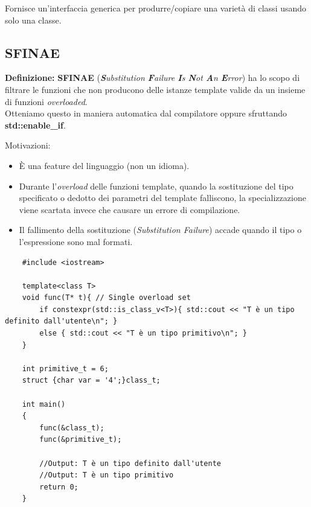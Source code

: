 \textsf{\small Fornisce un'interfaccia generica per produrre/copiare una varietà di classi usando solo una classe.} \\

\subsection{SFINAE}

\label{SFINAE}

\textsf{\small \textbf{Definizione: } \textbf{SFINAE} (\emph{\textbf{S}ubstitution \textbf{F}ailure \textbf{I}s \textbf{N}ot \textbf{A}n \textbf{E}rror}) ha lo scopo di filtrare le funzioni che non producono delle istanze template valide da un insieme di funzioni \emph{overloaded}.} \\

\textsf{\small Otteniamo questo in maniera automatica dal compilatore oppure sfruttando \textbf{std::enable\_if}.} \break

\textsf{\small Motivazioni: } \\

\begin{itemize}
	\item \textsf{\small È una feature del linguaggio (non un idioma).}
	\item \textsf{\small Durante l'\emph{overload} delle funzioni template, quando la sostituzione del tipo specificato o dedotto dei parametri del template falliscono, la specializzazione viene scartata invece che causare un errore di compilazione.}
	\item \textsf{\small Il fallimento della sostituzione (\emph{Substitution Failure}) accade quando il tipo o l'espressione sono mal formati.}
\end{itemize}

\begin{lstlisting}
	#include <iostream>
	
	template<class T>
	void func(T* t){ // Single overload set
		if constexpr(std::is_class_v<T>){ std::cout << "T è un tipo definito dall'utente\n"; }
		else { std::cout << "T è un tipo primitivo\n"; }
	}
	
	int primitive_t = 6;
	struct {char var = '4';}class_t;
	
	int main()
	{
		func(&class_t);
		func(&primitive_t);
		
		//Output: T è un tipo definito dall'utente
		//Output: T è un tipo primitivo
		return 0;
	}
\end{lstlisting}

